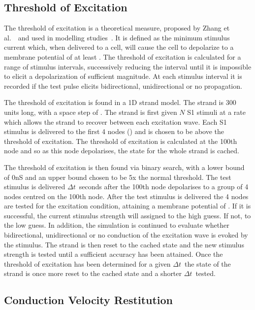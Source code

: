 \subsection{Threshold of Excitation}

The threshold of excitation is a theoretical measure, proposed by Zhang et
al.~\cite{Zhang2003}\ and used in modelling studies~\cite{Kharche2008}.  It is
defined as the minimum stimulus current which, when delivered to a cell, will
cause the cell to depolarize to a membrane potential of at least .  The
threshold of excitation is calculated for a range of stimulus intervals,
successively reducing the interval until it is impossible to elicit a
depolarization of sufficient magnitude.  At each stimulus interval it is
recorded if the test pulse elicits bidirectional, unidirectional or no
propagation.

The threshold of excitation is found in a 1D strand model.  The strand is 300
units long, with a space step of .  The strand is first given $N$ S1
stimuli at a rate which allows the strand to recover between each excitation
wave.  Each S1 stimulus is delivered to the first 4 nodes () and is
chosen to be above the threshold of excitation.  The threshold of excitation is
calculated at the 100th node and so as this node depolarises, the state for the
whole strand is cached.

The threshold of excitation is then found via binary search, with a lower bound
of \unit{0}{nS} and an upper bound chosen to be 5x the normal threshold.  The
test stimulus is delivered $\Delta t$\ seconds after the 100th node depolarises
to a group of 4 nodes centred on the 100th node.  After the test stimulus is
delivered the 4 nodes are tested for the excitation condition, attaining a
membrane potential of .  If it is successful, the current stimulus
strength will assigned to the high guess.  If not, to the low guess.  In
addition, the simulation is continued to evaluate whether bidirectional,
unidirectional or no conduction of the excitation wave is evoked by the
stimulus.  The strand is then reset to the cached state and the new stimulus
strength is tested until a sufficient accuracy has been attained.  Once the
threshold of excitation has been determined for a given $\Delta t$\ the state of
the strand is once more reset to the cached state and a shorter $\Delta t$\
tested.

\subsection{Conduction Velocity Restitution}

